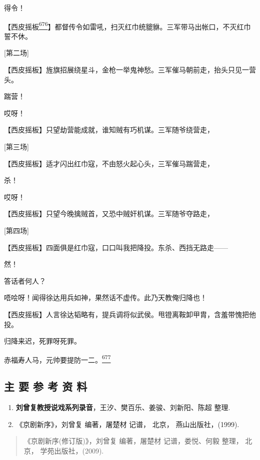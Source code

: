 得令！

【西皮摇板\protect\hyperlink{fn676}{\textsuperscript{676}}】都督传令如雷吼，扫灭红巾统貔貅。三军带马出帐口，不灭红巾誓不休。

{[}第二场{]}

【西皮摇板】旌旗招展绕星斗，金枪一举鬼神愁。三军催马朝前走，抬头只见一营头。

踹营！

哎呀！

【西皮摇板】只望劫营能成就，谁知贼有巧机谋。三军随爷绕营走，

{[}第三场{]}

【西皮摇板】适才闪出红巾寇，不由怒火起心头，三军催马踹营走，

杀！

哎呀！

【西皮摇板】只望今晚擒贼首，又恐中贼奸机谋。三军随爷夺路走，

{[}第四场{]}

【西皮摇板】四面俱是红巾寇，口口叫我把降投。东杀、西挡无路走------

然！

答话者何人？

唔哙呀！闻得徐达用兵如神，果然话不虚传。此乃天教俺归降也！

【西皮摇板】人言徐达韬略有，提兵调将似武侯。甩镫离鞍卸甲胄，含羞带愧把他投。

归降来迟，死罪呀死罪。

赤福寿人马，元帅要提防一二。\protect\hyperlink{fn677}{\textsuperscript{677}}

\hypertarget{ux4e3b-ux8981-ux53c2-ux8003-ux8d44-ux6599}{%
\subsection{主 要 参 考 资
料}\label{ux4e3b-ux8981-ux53c2-ux8003-ux8d44-ux6599}}

\begin{enumerate}
\def\labelenumi{\arabic{enumi}.}
\item
  \textbf{刘曾复教授说戏系列录音}，王汐、樊百乐、姜骏、刘新阳、陈超
  整理.
\item
  《京剧新序》，刘曾复 编著，屠楚材 记谱， 北京， 燕山出版社，(1999).
\end{enumerate}

\begin{quote}
《京剧新序(修订版)》，刘曾复 编著，屠楚材 记谱，娄悦、何毅 整理， 北京，
学苑出版社，(2009).
\end{quote}

